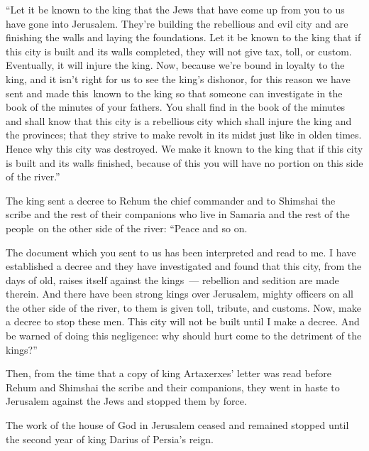 \begin{inparaenum}
   ``Let it be known to the king that the Jews that have come up from you to us have gone into Jerusalem. They're building the rebellious and evil city and are finishing the walls and laying the foundations.%
   Let it be known to the king that if this city is built and its walls completed, they will not give tax, toll, or custom. Eventually, it will injure the king.%
   Now, because we're bound in loyalty to the king, and it isn't right for us to see the king's dishonor, for this reason we have sent and made this\understood{}\ known to the king%
   so that someone can investigate in the book of the minutes of your fathers. You shall find in the book of the minutes and shall know that this city is a rebellious city which\understood{} shall injure the king and the provinces; that they strive to make revolt in its midst just like in olden times. Hence why this city was destroyed.%
   We make it known to the king that if this city is built and its walls finished, because of this you will have no portion on this side of the river.''%

   The king sent a decree to Rehum the chief commander and to Shimshai the scribe and the rest of their companions who live in Samaria and the rest of the people\understood{}\ on the other side of the river: ``Peace and so on.%

   The document which you sent to us has been interpreted and read to me.%
   I have established a decree and they have investigated and found that this city, from the days of old, raises itself against the kings~--- rebellion and sedition are made therein.%
   And there have been strong kings over Jerusalem, mighty officers on all the other side of the river, to them is given toll, tribute, and customs.%
   Now, make a decree to stop these men. This city will not be built until I make a decree.%
   And be warned of doing this negligence: why should hurt come to the detriment of the kings?''%

   Then, from the time that a copy of king Artaxerxes' letter was read before Rehum and Shimshai the scribe and their companions, they went in haste to Jerusalem against the Jews and stopped them by force.%

   The work of the house of God in Jerusalem ceased and remained stopped until the second year of king Darius of Persia's reign.%
\end{inparaenum}
